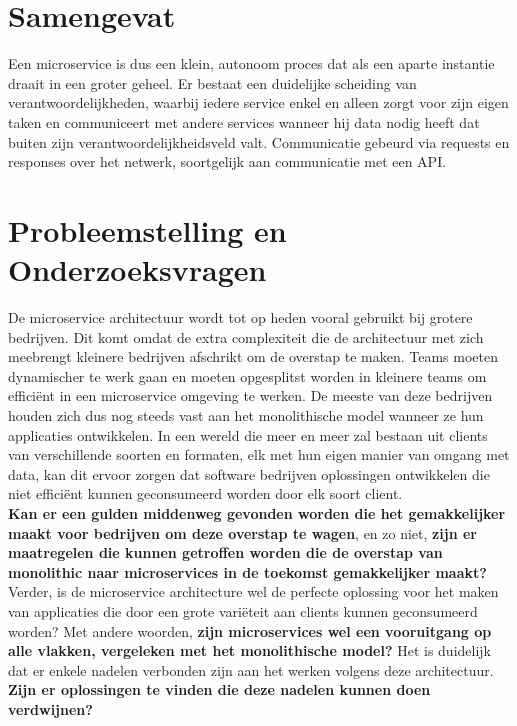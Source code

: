 \documentclass[pdftex,a4paper,12pt,twoside]{report}
\begin{document}
\section{Samengevat}
\label{sec:samengevat}
Een microservice is dus een klein, autonoom proces dat als een aparte instantie draait in een groter geheel. Er bestaat een duidelijke scheiding van verantwoordelijkheden, waarbij iedere service enkel en alleen zorgt voor zijn eigen taken en communiceert met andere services wanneer hij data nodig heeft dat buiten zijn verantwoordelijkheidsveld valt. Communicatie gebeurd via requests en responses over het netwerk, soortgelijk aan communicatie met een API.

\section{Probleemstelling en Onderzoeksvragen}
\label{sec:onderzoeksvragen}


De microservice architectuur wordt tot op heden vooral gebruikt bij grotere bedrijven. Dit komt omdat de extra complexiteit die de architectuur met zich meebrengt kleinere bedrijven afschrikt om de overstap te maken. Teams moeten dynamischer te werk gaan en moeten opgesplitst worden in kleinere teams om efficiënt in een microservice omgeving te werken. De meeste van deze bedrijven houden zich dus nog steeds vast aan het monolithische model wanneer ze hun applicaties ontwikkelen. In een wereld die meer en meer zal bestaan uit clients van verschillende soorten en formaten, elk met hun eigen manier van omgang met data, kan dit ervoor zorgen dat software bedrijven oplossingen ontwikkelen die niet efficiënt kunnen geconsumeerd worden door elk soort client.
\\
\textbf{Kan er een gulden middenweg gevonden worden die het gemakkelijker maakt voor bedrijven om deze overstap te wagen}, en zo niet, \textbf{zijn er maatregelen die kunnen getroffen worden die de overstap van monolithic naar microservices in de toekomst gemakkelijker maakt?}
\\
Verder, is de microservice architecture wel de perfecte oplossing voor het maken van applicaties die door een grote variëteit aan clients kunnen geconsumeerd worden? Met andere woorden, \textbf{zijn microservices wel een vooruitgang op alle vlakken, vergeleken met het monolithische model?} Het is duidelijk dat er enkele nadelen verbonden zijn aan het werken volgens deze architectuur. \textbf{Zijn er oplossingen te vinden die deze nadelen kunnen doen verdwijnen?}
\end{document}
